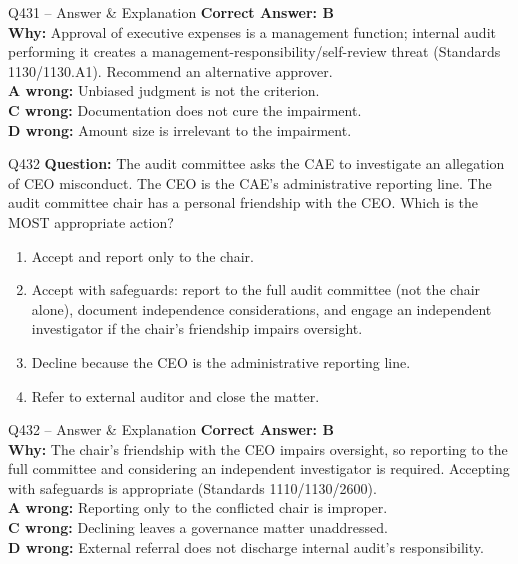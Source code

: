 \documentclass[aspectratio=169,10pt]{beamer}
\begin{document}
	\begin{frame}[t]{Q431 -- Answer \& Explanation}
		\small
		\textbf{Correct Answer: B} \\[4pt]
		\textbf{Why:} Approval of executive expenses is a management function; internal audit performing it creates a management-responsibility/self-review threat (Standards 1130/1130.A1). Recommend an alternative approver. \\[4pt]
		\textbf{A wrong:} Unbiased judgment is not the criterion. \\[2pt]
		\textbf{C wrong:} Documentation does not cure the impairment. \\[2pt]
		\textbf{D wrong:} Amount size is irrelevant to the impairment.
	\end{frame}
	
	\begin{frame}[t]{Q432}
		\small
		\textbf{Question:} The audit committee asks the CAE to investigate an allegation of CEO misconduct. The CEO is the CAE's administrative reporting line. The audit committee chair has a personal friendship with the CEO. Which is the MOST appropriate action?
		\begin{enumerate}[label=\Alph*.,itemsep=1pt,topsep=2pt]
			\item Accept and report only to the chair.
			\item Accept with safeguards: report to the full audit committee (not the chair alone), document independence considerations, and engage an independent investigator if the chair's friendship impairs oversight.
			\item Decline because the CEO is the administrative reporting line.
			\item Refer to external auditor and close the matter.
		\end{enumerate}
	\end{frame}
	
	\begin{frame}[t]{Q432 -- Answer \& Explanation}
		\small
		\textbf{Correct Answer: B} \\[4pt]
		\textbf{Why:} The chair's friendship with the CEO impairs oversight, so reporting to the full committee and considering an independent investigator is required. Accepting with safeguards is appropriate (Standards 1110/1130/2600). \\[4pt]
		\textbf{A wrong:} Reporting only to the conflicted chair is improper. \\[2pt]
		\textbf{C wrong:} Declining leaves a governance matter unaddressed. \\[2pt]
		\textbf{D wrong:} External referral does not discharge internal audit's responsibility.
	\end{frame}
	
\end{document}
